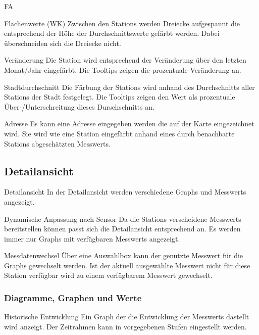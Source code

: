 \begin{Kriterien}{FA}
 \item[Flächenwerte (WK)]
   Zwischen den \glspl{Station} werden Dreiecke aufgespannt die entsprechend der Höhe der Durchschnittswerte gefärbt werden.
   Dabei überschneiden sich die Dreiecke nicht.

 \item[Veränderung]
   Die \gls{Station} wird entsprechend der Veränderung über den letzten Monat/Jahr eingefärbt.
   Die \glspl{Tooltip} zeigen die prozentuale Veränderung an.

 \item[Stadtdurchschnitt]
  Die Färbung der \glspl{Station} wird anhand des Durchschnitts aller \glspl{Station} der Stadt festgelegt.
  Die \glspl{Tooltip} zeigen den Wert als prozentuale Über-/Unterschreitung dieses Durschschnitts an. 

 \item[Adresse]
   Es kann eine Adresse eingegeben werden die auf der Karte eingezeichnet wird.
   Sie wird wie eine \gls{Station} eingefärbt anhand eines durch benachbarte \glspl{Station} abgeschätzten \glspl{Messwert}.

\subsection{Detailansicht}

 \item[Detailansicht]
   In der Detailansicht werden verschiedene \glspl{Graph} und \glspl{Messwert} angezeigt. 

 \item[Dynamische Anpassung nach Sensor]
   Da die \glspl{Station} verscheidene \glspl{Messwert} bereitstellen können passt sich die Detailansicht entsprechend an.
   Es werden immer nur \glspl{Graph} mit verfügbaren \glspl{Messwert} angezeigt.

 \item[Messdatenwechsel]
  Über eine Auswahlbox kann der genutzte \gls{Messwert} für die \glspl{Graph} gewechselt werden.
  Ist der aktuell ausgewählte \gls{Messwert} nicht für diese \gls{Station} verfügbar wird zu einem verfügbarem \gls{Messwert} gewechselt.

 \subsubsection{Diagramme, Graphen und Werte}

 \item[Historische Entwicklung]
   Ein Graph der die Entwicklung der \glspl{Messwert} dastellt wird anzeigt.
   Der Zeitrahmen kann in vorgegebenen Stufen eingestellt werden.
 

\end{Kriterien}
